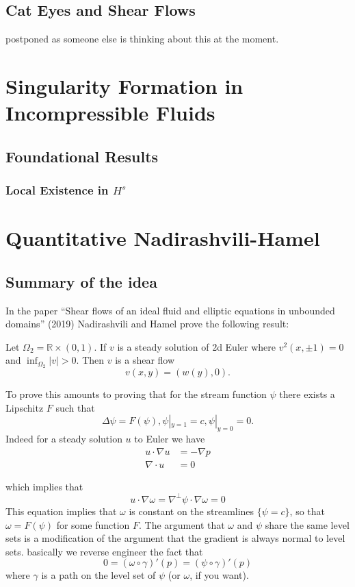 \section{Cat Eyes and Shear Flows}

postponed as someone else is thinking about this at the moment.

\chapter{Singularity Formation in Incompressible Fluids}

\section{Foundational Results}

\subsection{Local Existence in $H^s$}

\chapter{Quantitative Nadirashvili-Hamel}

\section{Summary of the idea}

In the paper ``Shear flows of an ideal fluid and elliptic equations in unbounded domains'' (2019) Nadirashvili and Hamel prove the following result:

\begin{theorem}
    Let $\Omega_2 = \mathbb{R} \times (0, 1)$. If $v$ is a steady solution of 2d Euler where $v^2(x, \pm 1) = 0$ and $\inf_{\Omega_2}|v| > 0$. Then $v$ is a shear flow
    \[v(x, y) = (w(y), 0).\]
\end{theorem}

To prove this amounts to proving that for the stream function $\psi$ there exists a Lipschitz $F$ such that 
\[\Delta \psi = F(\psi), \psi|_{y = 1} = c, \psi|_{y = 0} = 0.\] Indeed for a steady solution $u$ to Euler we have
\begin{align*}
    u \cdot \nabla u &= -\nabla p \\
    \nabla \cdot u &= 0
\end{align*}

which implies that 
\[u \cdot \nabla \omega = \nabla^{\perp}\psi \cdot \nabla \omega = 0\]
This equation implies that $\omega$ is constant on the streamlines $\{\psi = c\}$, so that $\omega = F(\psi)$ for some function $F$. The argument that $\omega$ and $\psi$ share the same level sets is a modification of the argument that the gradient is always normal to level sets. basically we reverse engineer the fact that 
\[0 = (\omega \circ \gamma)'(p) = (\psi \circ \gamma)'(p)\]
where $\gamma$ is a path on the level set of $\psi$ (or $\omega$, if you want).

